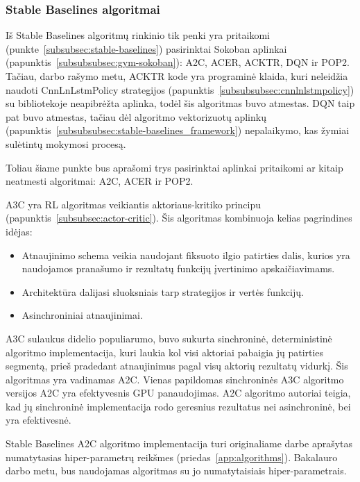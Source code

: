 \documentclass{VUMIFPSbakalaurinis}
\begin{document}
\subsubsection{Stable Baselines algoritmai}\label{subsubsec:algorithms}
{
	Iš Stable Baselines algoritmų rinkinio tik penki yra pritaikomi (punkte~\ref{subsubsec:stable-baselines}) pasirinktai Sokoban aplinkai (papunktis~\ref{subsubsubsec:gym-sokoban}): A2C, ACER, ACKTR, DQN ir POP2. Tačiau, darbo rašymo metu, ACKTR kode yra programinė klaida, kuri  neleidžia naudoti CnnLnLstmPolicy strategijos (papunktis~\ref{subsubsubsec:cnnlnlstmpolicy}) su bibliotekoje neapibrėžta aplinka, todėl šis algoritmas buvo atmestas. DQN taip pat buvo atmestas, tačiau dėl algoritmo vektorizuotų aplinkų (papunktis~\ref{subsubsubsec:stable-baselines_framework}) nepalaikymo, kas žymiai sulėtintų mokymosi procesą.\par
	
	Toliau šiame punkte bus aprašomi trys pasirinktai aplinkai pritaikomi ar kitaip neatmesti algoritmai: A2C, ACER ir POP2.
}
\label{subsubsubsec:a2c}
{
	A3C \cite{a3c} yra RL algoritmas veikiantis aktoriaus-kritiko principu (papunktis~\ref{subsubsec:actor-critic}). Šis algoritmas kombinuoja kelias pagrindines idėjas:
	\begin{itemize}
		\item Atnaujinimo schema veikia naudojant fiksuoto ilgio patirties dalis, kurios yra naudojamos pranašumo ir rezultatų funkcijų įvertinimo apskaičiavimams.
		
		\item Architektūra dalijasi sluoksniais tarp strategijos ir vertės funkcijų.
		
		\item Asinchroniniai atnaujinimai.
	\end{itemize}
	
	A3C sulaukus didelio populiarumo, buvo sukurta sinchroninė, deterministinė algoritmo implementacija, kuri laukia kol visi aktoriai pabaigia jų patirties segmentą, prieš pradedant atnaujinimus pagal visų aktorių rezultatų vidurkį. Šis algoritmas yra vadinamas A2C. Vienas papildomas sinchroninės A3C algoritmo versijos A2C yra efektyvesnis GPU panaudojimas. A2C algoritmo autoriai teigia, kad jų sinchroninė implementacija rodo geresnius rezultatus nei asinchroninė, bei yra efektivesnė\cite{wu_2019}.\par
	
	Stable Baselines A2C algoritmo implementacija turi originaliame darbe aprašytas numatytasias hiper-parametrų reikšmes (priedas~\ref{app:algorithms}). Bakalauro darbo metu, bus naudojamas algoritmas su jo numatytaisiais hiper-parametrais. 
}
\end{document}
